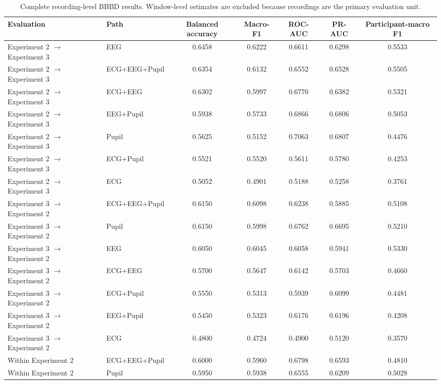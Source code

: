 \begin{table}[t]
\centering
\caption{Complete recording-level BBBD results. Window-level estimates are
excluded because recordings are the primary evaluation unit.}
\label{tab:bbbd_all_paths}
\scriptsize
\setlength{\tabcolsep}{3pt}
\begin{tabular}{llccccc}
\hline
Evaluation & Path & Balanced accuracy & Macro-F1 & ROC-AUC & PR-AUC &
Participant-macro F1 \\
\hline
Experiment 2 $\rightarrow$ Experiment 3 & EEG & 0.6458 & 0.6222 & 0.6611 & 0.6298 & 0.5533 \\
Experiment 2 $\rightarrow$ Experiment 3 & ECG+EEG+Pupil & 0.6354 & 0.6132 & 0.6552 & 0.6528 & 0.5505 \\
Experiment 2 $\rightarrow$ Experiment 3 & ECG+EEG & 0.6302 & 0.5997 & 0.6770 & 0.6382 & 0.5321 \\
Experiment 2 $\rightarrow$ Experiment 3 & EEG+Pupil & 0.5938 & 0.5733 & 0.6866 & 0.6806 & 0.5053 \\
Experiment 2 $\rightarrow$ Experiment 3 & Pupil & 0.5625 & 0.5152 & 0.7063 & 0.6807 & 0.4476 \\
Experiment 2 $\rightarrow$ Experiment 3 & ECG+Pupil & 0.5521 & 0.5520 & 0.5611 & 0.5780 & 0.4253 \\
Experiment 2 $\rightarrow$ Experiment 3 & ECG & 0.5052 & 0.4901 & 0.5188 & 0.5258 & 0.3761 \\
Experiment 3 $\rightarrow$ Experiment 2 & ECG+EEG+Pupil & 0.6150 & 0.6098 & 0.6238 & 0.5885 & 0.5108 \\
Experiment 3 $\rightarrow$ Experiment 2 & Pupil & 0.6150 & 0.5998 & 0.6762 & 0.6695 & 0.5210 \\
Experiment 3 $\rightarrow$ Experiment 2 & EEG & 0.6050 & 0.6045 & 0.6058 & 0.5941 & 0.5330 \\
Experiment 3 $\rightarrow$ Experiment 2 & ECG+EEG & 0.5700 & 0.5647 & 0.6142 & 0.5703 & 0.4660 \\
Experiment 3 $\rightarrow$ Experiment 2 & ECG+Pupil & 0.5550 & 0.5313 & 0.5939 & 0.6099 & 0.4481 \\
Experiment 3 $\rightarrow$ Experiment 2 & EEG+Pupil & 0.5450 & 0.5323 & 0.6176 & 0.6196 & 0.4208 \\
Experiment 3 $\rightarrow$ Experiment 2 & ECG & 0.4800 & 0.4724 & 0.4900 & 0.5120 & 0.3570 \\
Within Experiment 2 & ECG+EEG+Pupil & 0.6000 & 0.5960 & 0.6798 & 0.6593 & 0.4810 \\
Within Experiment 2 & Pupil & 0.5950 & 0.5938 & 0.6555 & 0.6209 & 0.5028 \\

\end{tabular}
\end{table}

